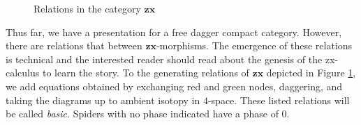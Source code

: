 \documentclass[a4paper,UKenglish]{lipics-v2016}
\begin{document}
\begin{figure}
	\caption{Relations in the category $\mathbf{zx}$}
	\label{fig:ZX equations}
\end{figure}

Thus far, we have a presentation for a free dagger compact category. However, there are relations that between $\mathbf{zx}$-morphisms.  The emergence of these relations is technical and the interested reader should read about the genesis of the zx-calculus \cite{CoeckeDuncan_QuantumObsFullPaper} to learn the story. To the generating relations of $\mathbf{zx}$ depicted in Figure \ref{fig:ZX equations}, we add equations obtained by exchanging red and green nodes, daggering, and taking the diagrams up to ambient isotopy in $4$-space. These listed relations will be called \emph{basic}.  Spiders with no phase indicated have a phase of $0$. 
\end{document}
